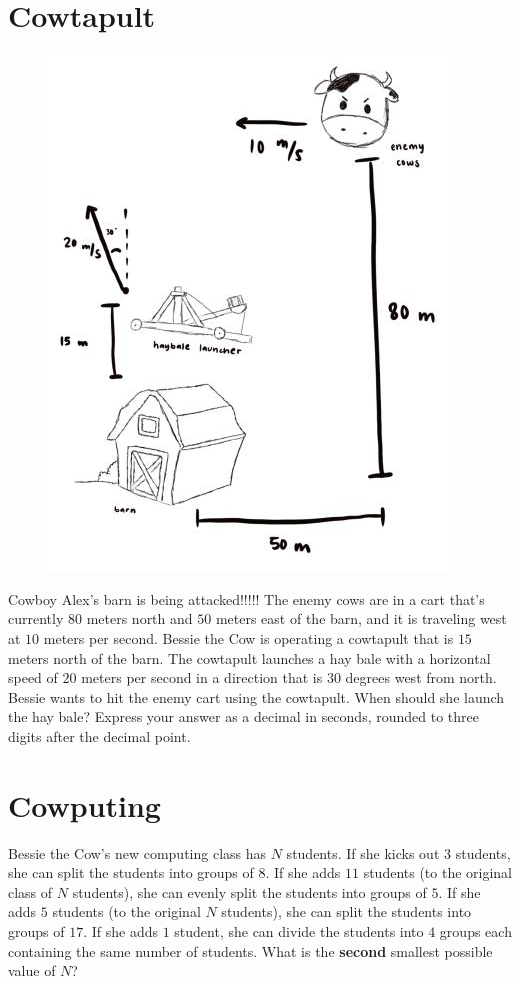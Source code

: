 \documentclass{article}
\begin{document}
\section*{Cowtapult}
\begin{figure}
    \vspace{-20pt}
    \centering
    \includegraphics[scale=0.25]{cowtapult.png}
    \vspace{-20pt}
\end{figure}
Cowboy Alex's barn is being attacked!!!!!
The enemy cows are in a cart that's currently $80$ meters north and $50$ meters east of the barn, and it is traveling west at $10$ meters per second.
Bessie the Cow is operating a cowtapult that is $15$ meters north of the barn.
The cowtapult launches a hay bale with a horizontal speed of $20$ meters per second in a direction that is $30$ degrees west from north.
Bessie wants to hit the enemy cart using the cowtapult.
When should she launch the hay bale?
Express your answer as a decimal in seconds, rounded to three digits after the decimal point.

\section*{Cowputing}
Bessie the Cow's new computing class has $N$ students.
If she kicks out $3$ students, she can split the students into groups of $8$.
If she adds $11$ students (to the original class of $N$ students), she can evenly split the students into groups of $5$.
If she adds $5$ students (to the original $N$ students), she can split the students into groups of $17$.
If she adds $1$ student, she can divide the students into $4$ groups each containing the same number of students.
What is the \textbf{second} smallest possible value of $N$?
\end{document}
